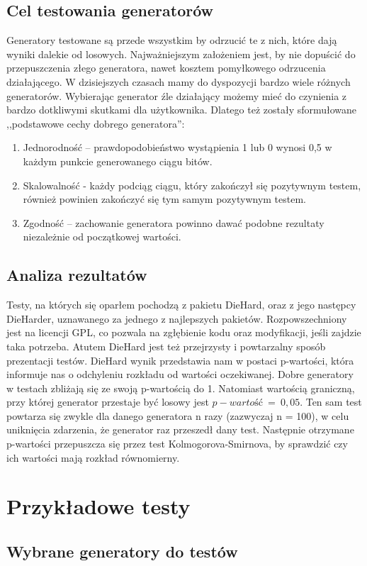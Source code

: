 \documentclass[11pt]{aghdpl}
\begin{document}
\subsection{Cel testowania generatorów}
Generatory testowane są przede wszystkim by odrzucić te z nich, które dają wyniki dalekie od losowych. Najważniejszym założeniem jest, by nie dopuścić do przepuszczenia złego generatora, nawet kosztem pomyłkowego odrzucenia działającego. W dzisiejszych czasach mamy do dyspozycji bardzo wiele różnych generatorów. Wybierając generator źle działający możemy mieć do czynienia z bardzo dotkliwymi skutkami dla użytkownika. Dlatego też zostały sformułowane ,,podstawowe cechy dobrego generatora'':
\begin{enumerate}
\item Jednorodność – prawdopodobieństwo wystąpienia 1 lub 0 wynosi 0,5 w każdym punkcie generowanego ciągu bitów.
\item Skalowalność - każdy podciąg ciągu, który zakończył się pozytywnym testem, również powinien zakończyć się tym samym pozytywnym testem.
\item Zgodność – zachowanie generatora powinno dawać podobne rezultaty niezależnie od początkowej wartości.
\end{enumerate}
\subsection{Analiza rezultatów}
Testy, na których się oparłem pochodzą z pakietu DieHard, oraz z jego następcy DieHarder, uznawanego za jednego z najlepszych pakietów. Rozpowszechniony jest na licencji GPL, co pozwala na zgłębienie kodu oraz modyfikacji, jeśli zajdzie taka potrzeba. Atutem DieHard jest też przejrzysty i powtarzalny sposób prezentacji testów. DieHard wynik przedstawia nam w postaci p-wartości, która informuje nas o odchyleniu rozkładu od wartości oczekiwanej. Dobre generatory w testach zbliżają się ze swoją p-wartością do 1. Natomiast wartością graniczną, przy której generator przestaje być losowy jest $p-wartość~=~0,05$. 
Ten sam test powtarza się zwykle dla danego generatora n razy (zazwyczaj n = 100), w celu uniknięcia zdarzenia, że generator raz przeszedł dany test. Następnie otrzymane p-wartości przepuszcza się przez test Kolmogorova-Smirnova, by sprawdzić czy ich wartości mają rozkład równomierny.
\section{Przykładowe testy}
\subsection{Wybrane generatory do testów}
\end{document}

